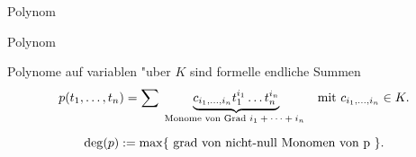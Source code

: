 \documentclass[class=article, crop=false]{standalone}
\begin{document}
\begin{zettel}{Polynom}
\begin{flashcard}[auntl33c]{Polynom}
	\begin{definition}[Polynom]
		Polynome auf variablen "uber $K$ sind formelle endliche Summen
		\[
			p (  t_1,\dots,t_n ) = \sum \underbrace{c_{i_1 ,\dots, i_n} t_1^{i_{1}} \dots t_n^{i_n}}_\tx{Monome von Grad $i_1 + \dots + i_n$ } \tx{mit}  c_{i_1,\dots,i_n} \in  K
		.\]
	\end{definition}
\end{flashcard}
\begin{definition}
	\[
		\deg(p) := \max \set{\tx{grad von nicht-null Monomen von p} }
	.\]
\end{definition}
\end{zettel}
\end{document}
